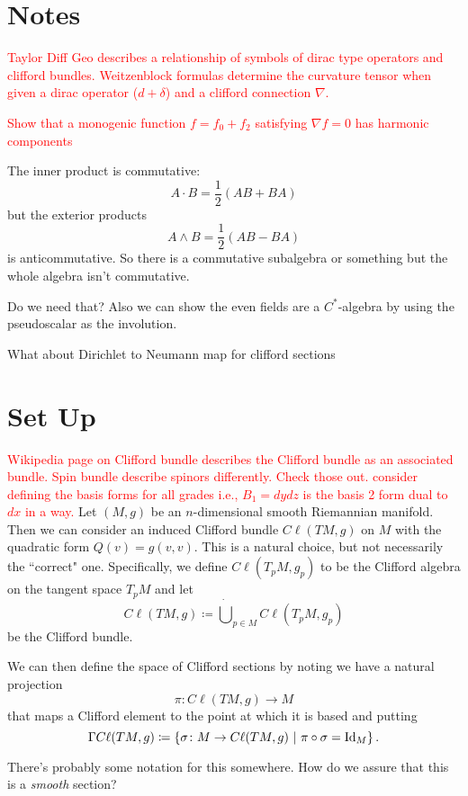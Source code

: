 \section{Notes}

\textcolor{red}{Taylor Diff Geo describes a relationship of symbols of dirac type operators and clifford bundles. Weitzenblock formulas determine the curvature tensor when given a dirac operator ($d+\delta$) and a clifford connection $\nabla$. }

\textcolor{red}{Show that a monogenic function $f=f_0 + f_2$ satisfying $\nabla f=0$ has harmonic components}

The inner product is commutative:
\[
A\cdot B = \frac{1}{2}(AB+BA)
\]
but the exterior products
\[
A\wedge B = \frac{1}{2}(AB-BA)
\]
is anticommutative. So there is a commutative subalgebra or something but the whole algebra isn't commutative.

Do we need that? Also we can show the even fields are a $C^*$-algebra by using the pseudoscalar as the involution.

What about Dirichlet to Neumann map for clifford sections

\section{Set Up}
\textcolor{red}{Wikipedia page on Clifford bundle describes the Clifford bundle as an associated bundle. Spin bundle describe spinors differently. Check those out.}
\textcolor{red}{consider defining the basis forms for all grades i.e., $B_1 = dydz$ is the basis 2 form dual to $dx$ in a way.}
Let $(M,g)$ be an $n$-dimensional smooth Riemannian manifold.  Then we can consider an induced Clifford bundle $C\ell(TM,g)$ on $M$ with the quadratic form $Q(v)=g(v,v)$.  This is a natural choice, but not necessarily the ``correct" one.  Specifically, we define $C\ell(T_pM,g_p)$ to be the Clifford algebra on the tangent space $T_pM$ and let
\[
C\ell(TM,g) \coloneqq \dot{\bigcup}_{p\in M} C\ell (T_pM,g_p)
\]
be the Clifford bundle.

We can then define the space of Clifford sections by noting we have a natural projection
\[
\pi \colon C\ell(TM,g) \to M
\]
that maps a Clifford element to the point at which it is based and putting
\[
\Gamma C \ell (TM,g) \coloneqq \left\{ \sigma \colon M \to C\ell(TM,g) ~\vert~ \pi \circ \sigma = \mathrm{Id}_M\right\}.
\]
\begin{question}
There's probably some notation for this somewhere. How do we assure that this is a \emph{smooth} section?
\end{question}

